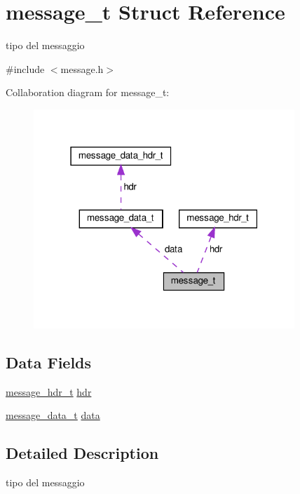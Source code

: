 \hypertarget{structmessage__t}{}\section{message\+\_\+t Struct Reference}
\label{structmessage__t}


tipo del messaggio  




{\ttfamily \#include $<$message.\+h$>$}



Collaboration diagram for message\+\_\+t\+:\nopagebreak
\begin{figure}[H]
\begin{center}
\leavevmode
\includegraphics[width=279pt]{structmessage__t__coll__graph}
\end{center}
\end{figure}
\subsection*{Data Fields}
\begin{DoxyCompactItemize}
\item 
\hyperlink{structmessage__hdr__t}{message\+\_\+hdr\+\_\+t} \hyperlink{structmessage__t_ad467c1444d361c52dd802f5609aa9f4c}{hdr}
\item 
\hyperlink{structmessage__data__t}{message\+\_\+data\+\_\+t} \hyperlink{structmessage__t_a4e61df2d2b915250fd442d19a80ca4ca}{data}
\end{DoxyCompactItemize}


\subsection{Detailed Description}
tipo del messaggio 


